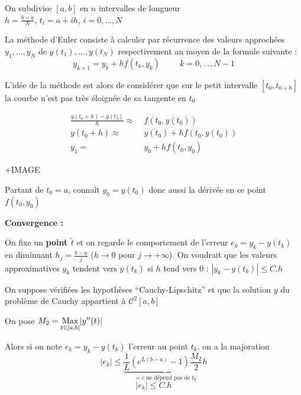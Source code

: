 \begin{exemple}
    On subdivise $[a,b]$ en $n$ intervalles de longueur \\ $h = \displaystyle\frac{b-a}{N}$, $t_i = a+ih$, $i=0,\dots,N$

    La méthode d'Euler consiste à calculer par récurrence des valeurs approchées
    $y_1, \dots, y_N$ de $y(t_1), \dots, y(t_N)$ respectivement au moyen de la formule suivante :
    \[
        y_{k+1} = y_k + h f(t_k,y_k) \hspace{1cm} k=0,\dots,N-1
    \]

    L'idée de la méthode est alors de considérer que sur le petit intervalle $[t_0,t_{0+h}]$ la
    courbe n'est pas très éloignée de sa tangente en $t_0$

    \[
        \begin{split}
            \frac{y(t_0 + h) - y(t_0)}{h} \approx \; & f(t_0,y(t_0)) \\
            y(t_0 + h) \approx \; & y(t_0) + h f (t_0, y(t_0)) \\
            y_1 = \; & y_0 + h f(t_0,y_0)
        \end{split}
    \]

    \vspace{1cm}

    \begin{multicols}{2}
            +IMAGE

            \columnbreak

            Partant de $t_0 = a$, connaît $y_0 = y(t_0)$ donc aussi la dérivée en ce point $f(t_0,y_0)$
    \end{multicols}
\end{exemple}

\textbf{Convergence :}

On fixe un \textbf{point $\tilde{t}$} et on regarde le comportement de l'erreur $e_k = y_k - y(t_k)$
en diminuant $h_j = \displaystyle\frac{b-a}{j}$ ($h \to 0$ pour $j \to + \infty$). On voudrait que
les valeurs approximatives $y_k$ tendent vers $y(t_k)$ si $h$ tend vers 0 :
$| y_k - y(t_k) | \leq C.h$

\begin{ftheo}
    On suppose vérifiées les hypothèses ``Cauchy-Lipschitz'' et que la solution $y$ du problème 
    de Cauchy appartient à $\mathcal{C}^2[a,b]$

    On pose $M_2 = \underset{t\in[a,b]}{\operatorname{Max}} |y''(t)|$

    Alors si on note $e_k = y_k - y(t_k)$ l'erreur au point $t_k$, on a la majoration
    \[
        |e_k| \leq \underbrace{\frac{1}{L} (e^{L(b-a)}-1) \frac{M_2}{2}h}_{\text{$= c$ ne dépend pas de $t_k$}}
    \]
    \[
        |e_k| \leq C.h
    \]
\end{ftheo}

